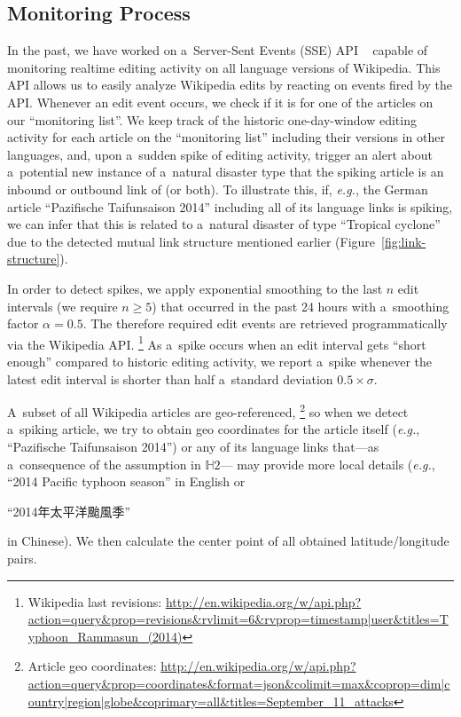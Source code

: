 \documentclass[letterpaper]{article}
\begin{document}
\subsection{Monitoring Process}
\label{sec:monitoring-process}

In the past, we have worked on a~Server-Sent Events (SSE) API%
~\cite{steiner2014bots} capable of monitoring realtime editing activity
on all language versions of Wikipedia.
This API allows us to easily analyze Wikipedia edits
by reacting on events fired by the API.
Whenever an edit event occurs, we check if it is for one of the articles
on our ``monitoring list''. 
We keep track of the historic one-day-window editing activity
for each article on the ``monitoring list'' including their versions in other languages,
and, upon a~sudden spike of editing activity,
trigger an alert about a~potential new instance of a~natural disaster type
that the spiking article is an inbound or outbound link of (or both).
To illustrate this, if, \emph{e.g.}, the German article
``Pazifische Taifunsaison 2014'' including all of its language links is spiking,
we can infer that this is related to a~natural disaster
of type ``Tropical cyclone'' due to the detected
mutual link structure mentioned earlier (Figure~\ref{fig:link-structure}).

In order to detect spikes, we apply exponential smoothing
to the last $n$ edit intervals (we require $n\geq5$) that occurred in the past 24 hours
with a~smoothing factor $\alpha = 0.5$.
The therefore required edit events are retrieved programmatically via the Wikipedia API.%
\footnote{Wikipedia last revisions:
\url{http://en.wikipedia.org/w/api.php?action=query&prop=revisions&rvlimit=6&rvprop=timestamp|user&titles=Typhoon_Rammasun_(2014)}}
As a~spike occurs when an edit interval gets ``short enough''
compared to historic editing activity,
we report a~spike whenever the latest edit interval
is shorter than half a~standard deviation $0.5 \times \sigma$.

A~subset of all Wikipedia articles are geo-referenced,%
\footnote{Article geo coordinates:
\url{http://en.wikipedia.org/w/api.php?action=query&prop=coordinates&format=json&colimit=max&coprop=dim|country|region|globe&coprimary=all&titles=September_11_attacks}}
so when we detect a~spiking article,
we try to obtain geo coordinates for the article itself
(\emph{e.g.}, ``Pazifische Taifunsaison 2014'')
or any of its language links
that---as a~consequence of the assumption in $\mathbb{H}2$---%
may provide more local details
(\emph{e.g.}, ``2014 Pacific typhoon season'' in English or
\begin{CJK*}{UTF8}{gbsn}``2014年太平洋颱風季''\end{CJK*} in Chinese).
We then calculate the center point of all obtained latitude/longitude pairs.
\end{document}
